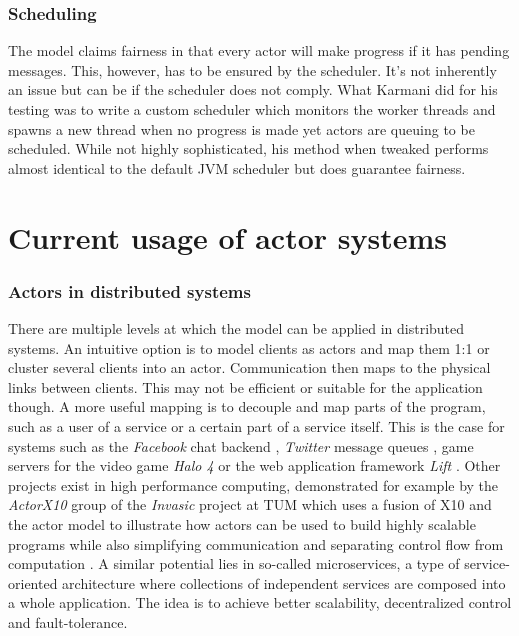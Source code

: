 \documentclass[A4]{article}
\begin{document}
\subsubsection{Scheduling}
The model claims fairness in that every actor will make progress if it has pending messages. This, however, has to be ensured by the scheduler. It's not inherently an issue but can be if the scheduler does not comply. What Karmani did for his testing was to write a custom scheduler which monitors the worker threads and spawns a new thread when no progress is made yet actors are queuing to be scheduled. While not highly sophisticated, his method when tweaked performs almost identical to the default JVM scheduler but does guarantee fairness. \cite[p.~9]{conf/pppj/KarmaniSA09}

\section{Current usage of actor systems}
\subsubsection{Actors in distributed systems}
There are multiple levels at which the model can be applied in distributed systems. An intuitive option is to model clients as actors and map them 1:1 or cluster several clients into an actor. Communication then maps to the physical links between clients. This may not be efficient or suitable for the application though. A more useful mapping is to decouple and map parts of the program, such as a user of a service or a certain part of a service itself. This is the case for systems such as the {\it Facebook} chat backend \cite{Facebook}, {\it Twitter} message queues \cite{Twitter}, game servers for the video game {\it Halo 4} \cite{Halo4} or the web application framework {\it Lift} \cite[p.~14]{Agha2016:2}. Other projects exist in high performance computing, demonstrated for example by the {\it ActorX10} group of the {\it Invasic} project at TUM which uses a fusion of X10 and the actor model to illustrate how actors can be used to build highly scalable programs while also simplifying communication and separating control flow from computation \cite[p.~4]{Roloff:2016:AAL:2931028.2931033}. 
A similar potential lies in so-called microservices, a type of service-oriented architecture where collections of independent services are composed into a whole application. The idea is to achieve better scalability, decentralized control and fault-tolerance. \cite{MicroS}
\end{document}
